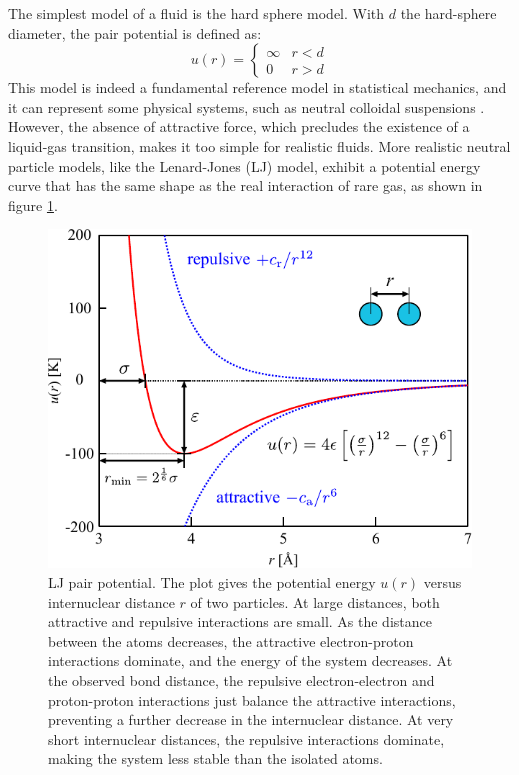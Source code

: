 The simplest model of a fluid is the hard sphere model. With $d$
the hard-sphere diameter, the pair potential is defined as:
\begin{equation}
u(r)=\begin{cases}
\infty & r<d\\
0 & r>d
\end{cases}
\end{equation}
This model is indeed a fundamental reference model in statistical
mechanics, and it can represent some physical systems, such as neutral
colloidal suspensions \citep{Cohen1998251}. However, the absence
of attractive force, which precludes the existence of a liquid-gas
transition, makes it too simple for realistic fluids. More realistic
neutral particle models, like the Lenard-Jones (LJ) model, exhibit
a potential energy curve that has the same shape as the real interaction
of rare gas, as shown in figure \ref{fig:LJ-pair-potential}.

\begin{figure}[h]
\begin{centering}
\includegraphics[scale=0.82]{_figure/lj-centre}
\par\end{centering}
\caption[LJ pair potential]{LJ pair potential. The plot gives the potential energy $u(r)$ versus
internuclear distance $r$ of two particles. At large distances, both
attractive and repulsive interactions are small. As the distance between
the atoms decreases, the attractive electron-proton interactions dominate,
and the energy of the system decreases. At the observed bond distance,
the repulsive electron-electron and proton-proton interactions just
balance the attractive interactions, preventing a further decrease
in the internuclear distance. At very short internuclear distances,
the repulsive interactions dominate, making the system less stable
than the isolated atoms.\label{fig:LJ-pair-potential}}
\end{figure}

